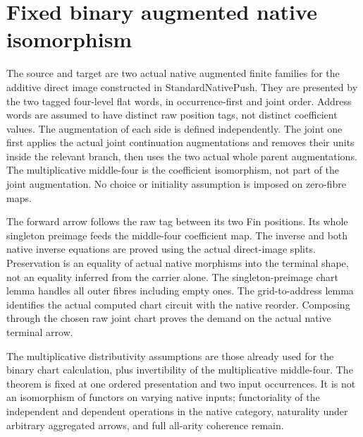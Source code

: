 \documentclass{article}
\begin{document}
\section*{Fixed binary augmented native isomorphism}
The source and target are two actual native augmented finite families
for the additive direct image constructed in StandardNativePush.
They are presented by the two tagged four-level flat words,
in occurrence-first and joint order. Address words are assumed to
have distinct raw position tags, not distinct coefficient values.
The augmentation of each side is defined independently. The joint
one first applies the actual joint continuation augmentations and
removes their units inside the relevant branch, then uses the two
actual whole parent augmentations. The multiplicative middle-four is
the coefficient isomorphism, not part of the joint augmentation.
No choice or initiality assumption is imposed on zero-fibre maps.

The forward arrow follows the raw tag between its two Fin positions.
Its whole singleton preimage feeds the middle-four coefficient map.
The inverse and both native inverse equations are proved using the
actual direct-image splits. Preservation is an equality of actual
native morphisms into the terminal shape, not an equality inferred
from the carrier alone. The singleton-preimage chart lemma handles
all outer fibres including empty ones. The grid-to-address lemma
identifies the actual computed chart circuit with the native reorder.
Composing through the chosen raw joint chart proves the demand on
the actual native terminal arrow.

The multiplicative distributivity assumptions are those already
used for the binary chart calculation, plus invertibility of the
multiplicative middle-four. The theorem is fixed at one ordered
presentation and two input occurrences. It is not an isomorphism of
functors on varying native inputs; functoriality of the independent
and dependent operations in the native category, naturality under
arbitrary aggregated arrows, and full all-arity coherence remain.
\end{document}
